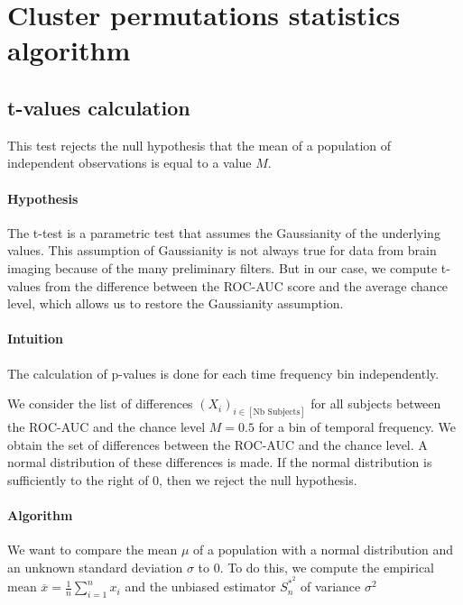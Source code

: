 \section{Cluster permutations statistics algorithm}

\subsection{t-values calculation}

This test rejects the null hypothesis that the mean of a population of independent observations is equal to a value $M$.

\paragraph{Hypothesis}

The t-test is a parametric test that assumes the Gaussianity of the underlying values. This assumption of Gaussianity is not always true for data from brain imaging because of the many preliminary filters. But in our case, we compute t-values from the difference between the ROC-AUC score and the average chance level, which allows us to restore the Gaussianity assumption.

\paragraph{Intuition}

The calculation of p-values is done for each time frequency bin independently.

We consider the list of differences $(X_i)_{i \in [\text{Nb Subjects}]}$ for all subjects between the ROC-AUC and the chance level $M=0.5$ for a bin of temporal frequency. We obtain the set of differences between the ROC-AUC and the chance level. A normal distribution of these differences is made. If the normal distribution is sufficiently to the right of 0, then we reject the null hypothesis.

\paragraph{Algorithm}

We want to compare the mean $\mu$ of a population with a normal distribution and an unknown standard deviation $\sigma$ to $0$. To do this, we compute the empirical mean $\overline{x} = \frac{1}{n}\sum_{i=1}^{n}x_i$ and the unbiased estimator $S^{\ast ^2}_n$ of variance $\sigma^2$

